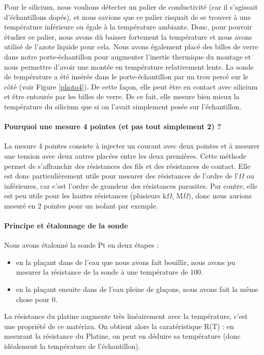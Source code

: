 Pour le silicium, nous voulions détecter un palier de conductivité (car il s'agissait d'échantillons dopés), et nous savions que ce palier risquait de se trouver à une température inférieure ou égale à la température ambiante.
Donc, pour pouvoir étudier ce palier, nous avons dû baisser fortement la température et nous avons utilisé de l'azote liquide pour cela.
Nous avons également placé des billes de verre dans notre porte-échantillon pour augmenter l'inertie thermique du montage et nous permettre d'avoir une montée en température relativement lente.
La sonde de température a été insérée dans le porte-échantillon par un trou percé sur le côté (voir Figure \ref{photo4}). De cette façon, elle peut être en contact avec silicium et être entourée par les billes de verre.
De ce fait, elle mesure bien mieux la température du silicium que si on l'avait simplement posée sur l'échantillon.


\paragraph{Pourquoi une mesure 4 pointes (et pas tout simplement 2) ?}
La mesure 4 pointes consiste à injecter un courant avec deux pointes et à mesurer une tension avec deux autres placées entre les deux premières.
Cette méthode permet de s'affranchir des résistances des fils et des résistances de contact.
Elle est donc particulièrement utile pour mesurer des résistances de l'ordre de l'$\Omega$ ou inférieures, car c'est l'ordre de grandeur des résistances parasites.
Par contre, elle est peu utile pour les hautes résistances (plusieurs k$\Omega$, M$\Omega$), donc nous aurions mesuré en 2 pointes pour un isolant par exemple.


\paragraph{Principe et étalonnage de la sonde}
Nous avons étalonné la sonde Pt en deux étapes :

\begin{itemize}
  \item en la plaçant dans de l'eau que nous avons fait bouillir, nous avons pu mesurer la résistance de la sonde à une température de 100\celsius{}.
  \item en la plaçant ensuite dans de l'eau pleine de glaçons, nous avons fait la même chose pour 0\celsius{}.
\end{itemize}

La résistance du platine augmente très linéairement avec la température, c'est une propriété de ce matériau.
On obtient alors la caratéristique R(T) : en mesurant la résistance du Platine, on peut en déduire sa température (donc idéalement la température de l'échantillon).


